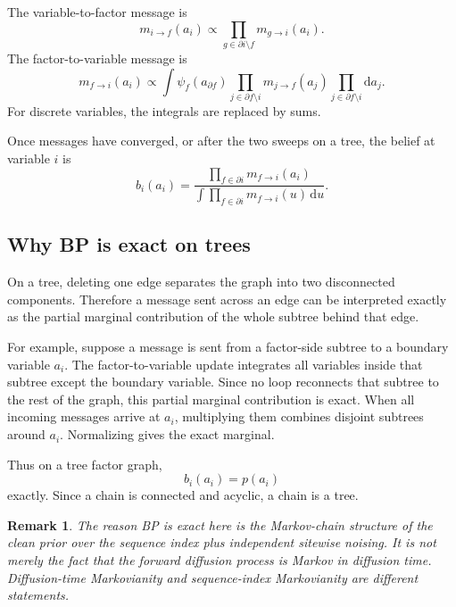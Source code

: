 \documentclass[11pt]{article}
\newtheorem{remark}{Remark}
\begin{document}
The variable-to-factor message is
\begin{equation}
  m_{i\to f}(a_i)
  \propto
  \prod_{g\in \partial i\setminus f} m_{g\to i}(a_i).
  \label{eq:var-to-factor}
\end{equation}
The factor-to-variable message is
\begin{equation}
  m_{f\to i}(a_i)
  \propto
  \int
  \psi_f(a_{\partial f})
  \prod_{j\in \partial f\setminus i}m_{j\to f}(a_j)
  \prod_{j\in \partial f\setminus i}\mathrm{d}a_j.
  \label{eq:factor-to-var}
\end{equation}
For discrete variables, the integrals are replaced by sums.

Once messages have converged, or after the two sweeps on a tree, the belief at variable \(i\) is
\begin{equation}
  b_i(a_i)
  =
  \frac{\prod_{f\in\partial i}m_{f\to i}(a_i)}
  {\int \prod_{f\in\partial i}m_{f\to i}(u)\,\mathrm{d}u}.
  \label{eq:belief-generic}
\end{equation}

\subsection{Why BP is exact on trees}

On a tree, deleting one edge separates the graph into two disconnected components. Therefore a message sent across an edge can be interpreted exactly as the partial marginal contribution of the whole subtree behind that edge.

For example, suppose a message is sent from a factor-side subtree to a boundary variable \(a_i\). The factor-to-variable update integrates all variables inside that subtree except the boundary variable. Since no loop reconnects that subtree to the rest of the graph, this partial marginal contribution is exact. When all incoming messages arrive at \(a_i\), multiplying them combines disjoint subtrees around \(a_i\). Normalizing gives the exact marginal.

Thus on a tree factor graph,
\begin{equation}
  b_i(a_i)=p(a_i)
  \label{eq:bp-exact-tree}
\end{equation}
exactly. Since a chain is connected and acyclic, a chain is a tree.

\begin{remark}
The reason BP is exact here is the Markov-chain structure of the clean prior over the sequence index plus independent sitewise noising. It is not merely the fact that the forward diffusion process is Markov in diffusion time. Diffusion-time Markovianity and sequence-index Markovianity are different statements.
\end{remark}
\end{document}
